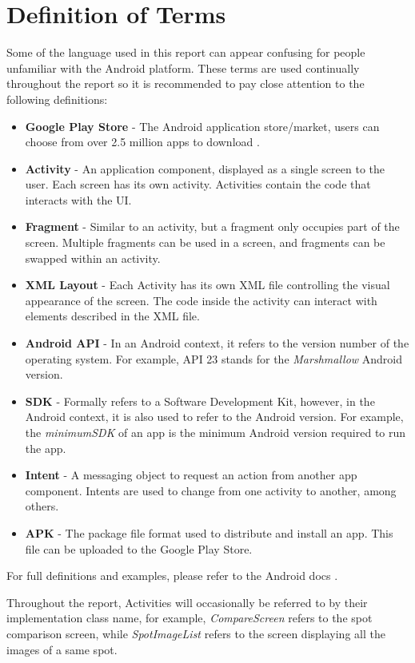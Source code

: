 \section{Definition of Terms} \label{definitionssection}
Some of the language used in this report can appear confusing for people unfamiliar with the Android platform. These terms are used continually throughout the report so it is recommended to pay close attention to the following definitions:
\begin{itemize}
    \item \textbf{Google Play Store} - The Android application store/market, users can choose from over 2.5 million apps to download \cite{appbrain_2019}.
    \item \textbf{Activity} - An application component, displayed as a single screen to the user. Each screen has its own activity. Activities contain the code that interacts with the UI.
    \item \textbf{Fragment} - Similar to an activity, but a fragment only occupies part of the screen. Multiple fragments can be used in a screen, and fragments can be swapped within an activity.
    \item \textbf{XML Layout} - Each Activity has its own XML file controlling the visual appearance of the screen. The code inside the activity can interact with elements described in the XML file.
    \item \textbf{Android API} - In an Android context, it refers to the version number of the operating system. For example, API 23 stands for the \emph{Marshmallow} Android version.
    \item \textbf{SDK} - Formally refers to a Software Development Kit, however, in the Android context, it is also used to refer to the Android version. For example, the \emph{minimumSDK} of an app is the minimum Android version required to run the app.
    \item \textbf{Intent} - A messaging object to request an action from another app component. Intents are used to change from one activity to another, among others.
    \item \textbf{APK} - The package file format used to distribute and install an app. This file can be uploaded to the Google Play Store.
\end{itemize}
For full definitions and examples, please refer to the Android docs \cite{androidfullguide}.

Throughout the report, Activities will occasionally be referred to by their implementation class name, for example, \emph{CompareScreen} refers to the spot comparison screen, while \emph{SpotImageList} refers to the screen displaying all the images of a same spot.

